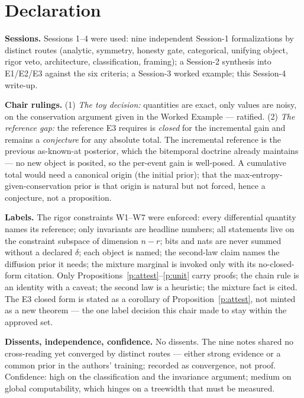 \documentclass[11pt]{article}
\theoremstyle{definition}\newtheorem{definition}{Definition}
\theoremstyle{plain}\newtheorem{proposition}{Proposition}
\theoremstyle{remark}\newtheorem{remark}{Remark}
\begin{document}
\section{Declaration}
\textbf{Sessions.} Sessions 1--4 were used: nine independent Session-1 formalizations by distinct
routes (analytic, symmetry, honesty gate, categorical, unifying object, rigor veto, architecture,
classification, framing); a Session-2 synthesis into E1/E2/E3 against the six criteria; a
Session-3 worked example; this Session-4 write-up.

\smallskip\noindent\textbf{Chair rulings.} (1) \emph{The toy decision:} quantities are exact,
only values are noisy, on the conservation argument given in the Worked Example --- ratified. (2)
\emph{The reference gap:} the reference E3 requires is \emph{closed} for the incremental gain and
remains a \emph{conjecture} for any absolute total. The incremental reference is the previous
as-known-at posterior, which the bitemporal doctrine already maintains --- no new object is
posited, so the per-event gain is well-posed. A cumulative total would need a canonical origin
(the initial prior); that the max-entropy-given-conservation prior is that origin is natural but
not forced, hence a conjecture, not a proposition.

\smallskip\noindent\textbf{Labels.} The rigor constraints W1--W7 were enforced: every
differential quantity names its reference; only invariants are headline numbers; all statements
live on the constraint subspace of dimension $n-r$; bits and nats are never summed without a
declared $\delta$; each object is named; the second-law claim names the diffusion prior it needs;
the mixture marginal is invoked only with its no-closed-form citation. Only
Propositions~\ref{p:attest}--\ref{p:unit} carry proofs; the chain rule is an identity with a
caveat; the second law is a heuristic; the mixture fact is cited. The E3 closed form is stated as
a corollary of Proposition~\ref{p:attest}, not minted as a new theorem --- the one label decision
this chair made to stay within the approved set.

\smallskip\noindent\textbf{Dissents, independence, confidence.} No dissents. The nine notes
shared no cross-reading yet converged by distinct routes --- either strong evidence or a common
prior in the authors' training; recorded as convergence, not proof. Confidence: high on the
classification and the invariance argument; medium on global computability, which hinges on a
treewidth that must be measured.
\end{document}
